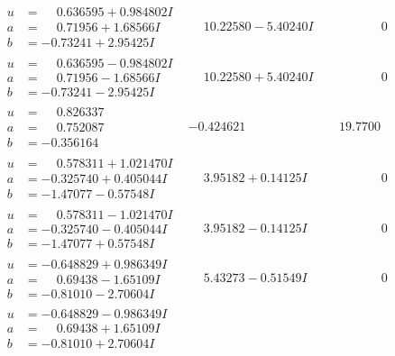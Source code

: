 \documentclass[1p]{elsarticle_modified}
\theoremstyle{definition}
\begin{document}
$$\begin{array}{c|c|c}
\begin{aligned}
u &= \phantom{-}0.636595 + 0.984802 I \\
a &= \phantom{-}0.71956 + 1.68566 I \\
b &= -0.73241 + 2.95425 I\end{aligned}
 & \phantom{-}10.22580 - 5.40240 I & \phantom{-0.000000 } 0 \\ \hline\begin{aligned}
u &= \phantom{-}0.636595 - 0.984802 I \\
a &= \phantom{-}0.71956 - 1.68566 I \\
b &= -0.73241 - 2.95425 I\end{aligned}
 & \phantom{-}10.22580 + 5.40240 I & \phantom{-0.000000 } 0 \\ \hline\begin{aligned}
u &= \phantom{-}0.826337\phantom{ +0.000000I} \\
a &= \phantom{-}0.752087\phantom{ +0.000000I} \\
b &= -0.356164\phantom{ +0.000000I}\end{aligned}
 & -0.424621\phantom{ +0.000000I} & \phantom{-}19.7700\phantom{ +0.000000I} \\ \hline\begin{aligned}
u &= \phantom{-}0.578311 + 1.021470 I \\
a &= -0.325740 + 0.405044 I \\
b &= -1.47077 - 0.57548 I\end{aligned}
 & \phantom{-}3.95182 + 0.14125 I & \phantom{-0.000000 } 0 \\ \hline\begin{aligned}
u &= \phantom{-}0.578311 - 1.021470 I \\
a &= -0.325740 - 0.405044 I \\
b &= -1.47077 + 0.57548 I\end{aligned}
 & \phantom{-}3.95182 - 0.14125 I & \phantom{-0.000000 } 0 \\ \hline\begin{aligned}
u &= -0.648829 + 0.986349 I \\
a &= \phantom{-}0.69438 - 1.65109 I \\
b &= -0.81010 - 2.70604 I\end{aligned}
 & \phantom{-}5.43273 - 0.51549 I & \phantom{-0.000000 } 0 \\ \hline\begin{aligned}
u &= -0.648829 - 0.986349 I \\
a &= \phantom{-}0.69438 + 1.65109 I \\
b &= -0.81010 + 2.70604 I\end{aligned}

\end{array}$$
\end{document}
